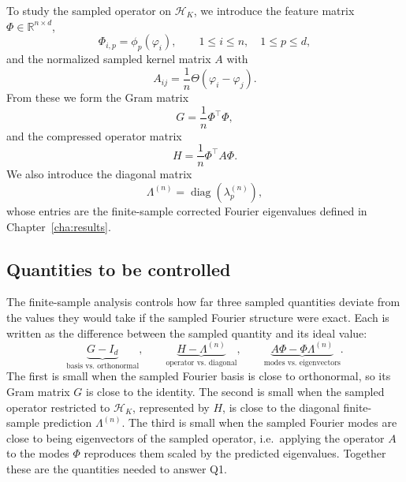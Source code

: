 To study the sampled operator on \(\mathcal{H}_K\), we introduce the feature matrix
\(\Phi\in\mathbb{R}^{n\times d}\),
\begin{equation}
	\Phi_{i,p}=\phi_p(\varphi_i),
	\qquad
	1\leq i\leq n,\quad 1\leq p\leq d,
	\label{eq:method-feature-matrix}
\end{equation}
and the normalized sampled kernel matrix \(A\) with
\begin{equation}
	A_{ij}=\frac{1}{n}\Theta(\varphi_i-\varphi_j).
	\label{eq:method-empirical-operator}
\end{equation}
From these we form the Gram matrix
\begin{equation}
	G=\frac{1}{n}\Phi^\top\Phi,
	\label{eq:method-gram-matrix}
\end{equation}
and the compressed operator matrix
\begin{equation}
	H=\frac{1}{n}\Phi^\top A\Phi.
	\label{eq:method-compressed-operator}
\end{equation}
We also introduce the diagonal matrix
\begin{equation}
	\Lambda^{(n)}=\operatorname{diag}(\lambda_p^{(n)}),
	\label{eq:method-finite-sample-eigenvalue-matrix}
\end{equation}
whose entries are the finite-sample corrected Fourier eigenvalues defined in
Chapter~\ref{cha:results}.

\subsection{Quantities to be controlled}
The finite-sample analysis controls how far three sampled quantities deviate from
the values they would take if the sampled Fourier structure were exact. Each is
written as the difference between the sampled quantity and its ideal value:
\begin{equation}
	\underbrace{G-I_d}_{\text{basis vs.\ orthonormal}},
	\qquad
	\underbrace{H-\Lambda^{(n)}}_{\text{operator vs.\ diagonal}},
	\qquad
	\underbrace{A\Phi-\Phi\Lambda^{(n)}}_{\text{modes vs.\ eigenvectors}}.
	\label{eq:method-finite-sample-objects}
\end{equation}
The first is small when the sampled Fourier basis is close to orthonormal, so its
Gram matrix \(G\) is close to the identity. The second is small when the sampled
operator restricted to \(\mathcal H_K\), represented by \(H\), is close to the
diagonal finite-sample prediction \(\Lambda^{(n)}\). The third is small when the
sampled Fourier modes are close to being eigenvectors of the sampled operator,
i.e.\ applying the operator \(A\) to the modes \(\Phi\) reproduces them scaled by
the predicted eigenvalues. Together these are the quantities needed to answer Q1.

